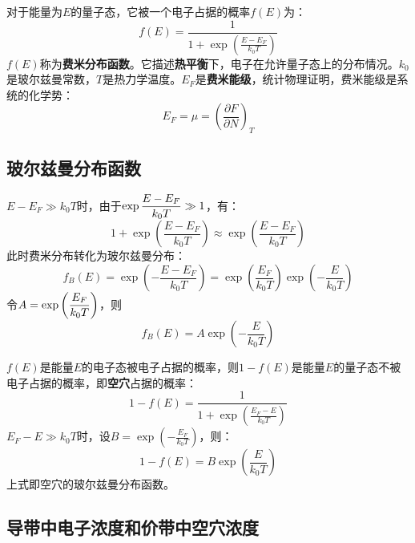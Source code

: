 对于能量为$E$的量子态，它被一个电子占据的概率$f(E)$为：
\begin{equation}
    f(E)=\frac{1}{1+\exp{\left(\frac{E-E_F}{k_0T}\right)}}
\end{equation}
$f(E)$称为\textbf{费米分布函数}。它描述\textbf{热平衡}下，电子在允许量子态上的分布情况。$k_0$是玻尔兹曼常数，$T$是热力学温度。$E_F$是\textbf{费米能级}，统计物理证明，费米能级是系统的化学势：
\begin{equation}
    E_F=\mu=\left(\frac{\partial F}{\partial N}\right)_T
\end{equation}

\subsection{玻尔兹曼分布函数}

\vspace{1ex}$E-E_F\gg k_0T$时，由于$\displaystyle\exp{\frac{E-E_F}{k_0 T}}\gg 1$，有：
\begin{equation}
    1+\exp{\left(\frac{E-E_F}{k_0T}\right)}\approx\exp{\left(\frac{E-E_F}{k_0T}\right)}
\end{equation}
此时费米分布转化为玻尔兹曼分布：
\begin{equation}
    f_B(E)=\exp{\left(-\frac{E-E_F}{k_0T}\right)}=\exp{\left(\frac{E_F}{k_0T}\right)}\exp{\left(-\frac{E}{k_0T}\right)}
\end{equation}
\vspace{1ex}令$A=\displaystyle\exp{\left(\frac{E_F}{k_0T}\right)}$，则
\begin{equation}
    f_B(E)=A\exp{\left(-\frac{E}{k_0T}\right)}
    \label{eq:chap-3-electron-distribute-fun}
\end{equation}

$f(E)$是能量$E$的电子态被电子占据的概率，则$1-f(E)$是能量$E$的量子态不被电子占据的概率，即\textbf{空穴}占据的概率：
\begin{equation}
    1-f(E)=\frac{1}{1+\exp{\left(\frac{E_F-E}{k_0T}\right)}}
\end{equation}
\vspace{1ex}$E_F-E\gg k_0T$时，设$B=\exp{\left(-\frac{E_F}{k_0T}\right)}$，则：
\begin{equation}
    1-f(E)=B\exp{\left(\frac{E}{k_0T}\right)}
\end{equation}
上式即空穴的玻尔兹曼分布函数。

\subsection{导带中电子浓度和价带中空穴浓度}

